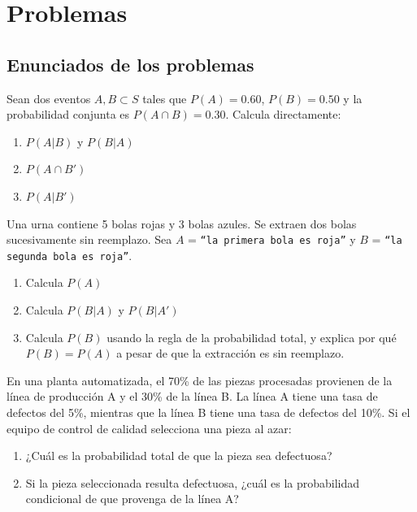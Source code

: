 \section*{Problemas}

\subsection*{Enunciados de los problemas}

\begin{problema}
	\label{prob:8794f31}
	Sean dos eventos $A, B \subset S$ tales que $P(A) = 0.60$, $P(B) = 0.50$ y la probabilidad conjunta es $P(A \cap B) = 0.30$. Calcula directamente:
	\begin{enumerate}
		\item $P(A|B)$ y $P(B|A)$
		\item $P(A \cap B')$
		\item $P(A|B')$
	\end{enumerate}
\end{problema}

\begin{problema}
	\label{prob:cf929e4}
	Una urna contiene 5 bolas rojas y 3 bolas azules. Se extraen dos bolas sucesivamente sin reemplazo. Sea $A$ = \texttt{``la primera bola es roja''} y $B$ = \texttt{``la segunda bola es roja''}.
	\begin{enumerate}
		\item Calcula $P(A)$
		\item Calcula $P(B|A)$ y $P(B|A')$
		\item Calcula $P(B)$ usando la regla de la probabilidad total, y explica por qué $P(B)=P(A)$ a pesar de que la extracción es sin reemplazo.
	\end{enumerate}
\end{problema}

\begin{problema}
	\label{prob:52e63a3}
	En una planta automatizada, el 70\% de las piezas procesadas provienen de la línea de producción A y el 30\% de la línea B. La línea A tiene una tasa de defectos del 5\%, mientras que la línea B tiene una tasa de defectos del 10\%. Si el equipo de control de calidad selecciona una pieza al azar:
	\begin{enumerate}
		\item ¿Cuál es la probabilidad total de que la pieza sea defectuosa?
		\item Si la pieza seleccionada resulta defectuosa, ¿cuál es la probabilidad condicional de que provenga de la línea A?
	\end{enumerate}
\end{problema}

